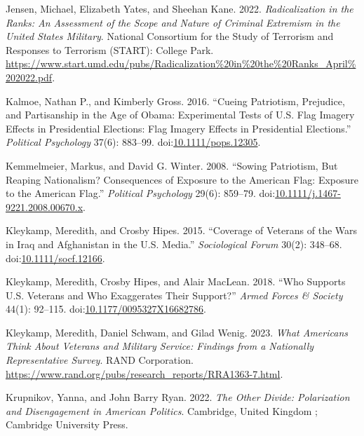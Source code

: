 \documentclass[
  12pt,
  letterpaper,
]{article}
\newlength{\cslhangindent}
\newenvironment{CSLReferences}[2] %
 {\begin{list}{}{%
  \setlength{\itemindent}{0pt}
  \setlength{\leftmargin}{0pt}
  \setlength{\parsep}{0pt}
  \ifodd #1
   \setlength{\leftmargin}{\cslhangindent}
   \setlength{\itemindent}{-1\cslhangindent}
  \fi
  \setlength{\itemsep}{#2\baselineskip}}}
 {\end{list}}
\begin{document}
\begin{CSLReferences}{1}{1}
Jensen, Michael, Elizabeth Yates, and Sheehan Kane. 2022.
\emph{Radicalization in the {Ranks}: {An Assessment} of the {Scope} and
{Nature} of {Criminal Extremism} in the {United States Military}}.
{National Consortium for the Study of Terrorism and Responses to
Terrorism (START): College Park}.
\url{https://www.start.umd.edu/pubs/Radicalization\%20in\%20the\%20Ranks_April\%202022.pdf}.

Kalmoe, Nathan P., and Kimberly Gross. 2016. {``Cueing {Patriotism},
{Prejudice}, and {Partisanship} in the {Age} of {Obama}: {Experimental
Tests} of {U}.{S}. {Flag Imagery Effects} in {Presidential Elections}:
{Flag Imagery Effects} in {Presidential Elections}.''} \emph{Political
Psychology} 37(6): 883--99.
doi:\href{https://doi.org/10.1111/pops.12305}{10.1111/pops.12305}.

Kemmelmeier, Markus, and David G. Winter. 2008. {``Sowing {Patriotism},
{But Reaping Nationalism}? {Consequences} of {Exposure} to the {American
Flag}: {Exposure} to the {American Flag}.''} \emph{Political Psychology}
29(6): 859--79.
doi:\href{https://doi.org/10.1111/j.1467-9221.2008.00670.x}{10.1111/j.1467-9221.2008.00670.x}.

Kleykamp, Meredith, and Crosby Hipes. 2015. {``Coverage of {Veterans} of
the {Wars} in {Iraq} and {Afghanistan} in the {U}.{S}. {Media}.''}
\emph{Sociological Forum} 30(2): 348--68.
doi:\href{https://doi.org/10.1111/socf.12166}{10.1111/socf.12166}.

Kleykamp, Meredith, Crosby Hipes, and Alair MacLean. 2018. {``Who
{Supports U}.{S}. {Veterans} and {Who Exaggerates Their Support}?''}
\emph{Armed Forces \& Society} 44(1): 92--115.
doi:\href{https://doi.org/10.1177/0095327X16682786}{10.1177/0095327X16682786}.

Kleykamp, Meredith, Daniel Schwam, and Gilad Wenig. 2023. \emph{What
{Americans Think About Veterans} and {Military Service}: {Findings} from
a {Nationally Representative Survey}}. RAND Corporation.
\url{https://www.rand.org/pubs/research_reports/RRA1363-7.html}.

Krupnikov, Yanna, and John Barry Ryan. 2022. \emph{The Other Divide:
Polarization and Disengagement in {American} Politics}. Cambridge,
United Kingdom ; Cambridge University Press.


\end{CSLReferences}
\end{document}
